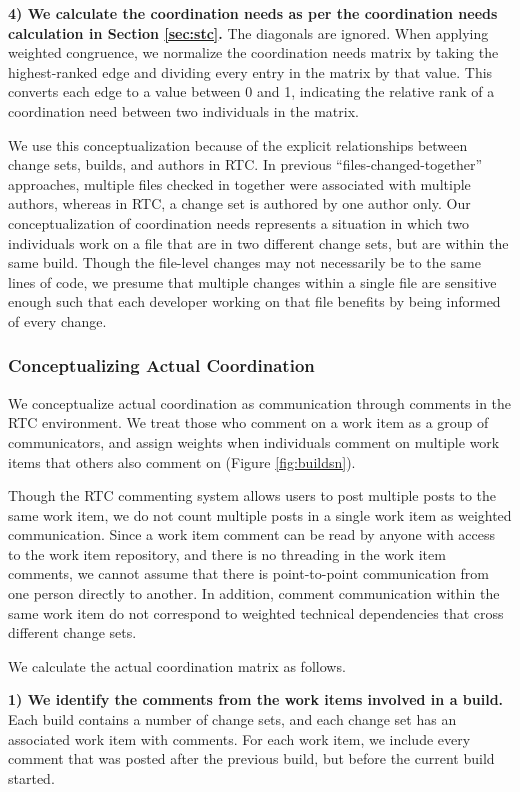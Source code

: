\textbf{4) We calculate the coordination needs as per the coordination needs calculation in Section \ref{sec:stc}.} The diagonals are ignored. When applying weighted congruence, we normalize the coordination needs matrix by taking the highest-ranked edge and dividing every entry in the matrix by that value. This converts each edge to a value between 0 and 1, indicating the relative rank of a coordination need between two individuals in the matrix.

We use this conceptualization because of the explicit relationships between change sets, builds, and authors in RTC. In previous ``files-changed-together'' approaches, multiple files checked in together were associated with multiple authors, whereas in RTC, a change set is authored by one author only. Our conceptualization of coordination needs represents a situation in which two individuals work on a file that are in two different change sets, but are within the same build. Though the file-level changes may not necessarily be to the same lines of code, we presume that multiple changes within a single file are sensitive enough such that each developer working on that file benefits by being informed of every change.

\subsubsection{Conceptualizing Actual Coordination}


We conceptualize actual coordination as communication through comments in the
RTC environment. We treat those who comment on a work item as a group of communicators, and assign weights when individuals comment on multiple work items that others also comment on (Figure \ref{fig:buildsn}).

Though the RTC commenting system allows users to post multiple posts to the same work item, we do not count multiple posts in a single work item as weighted communication.
Since a work item comment can be read by anyone with access to the work item repository, and there is no threading in the work item comments, we cannot assume that there is point-to-point communication from one person directly to another.
In addition, comment communication within the same work item do not correspond to weighted technical dependencies that cross different change sets.

We calculate the actual coordination matrix as follows.

\textbf{1) We identify the comments from the work items involved in a build.} Each build contains a number of change sets, and each change set has an associated work item with comments. For each work item, we include every comment that was posted after the previous build, but before the current build started.

